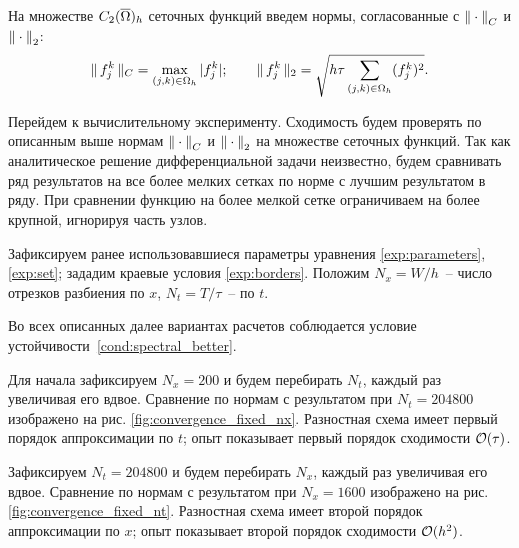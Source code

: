На множестве $C_2({\overline{\Omega}})_h$ сеточных функций введем нормы, согласованные с ${\| \cdot \|}_C$ и ${\| \cdot \|}_2$:
$$\| \, f_j^k \, \|_C = \max \limits_{(j, k) \in \Omega_h} |f_j^k|; \qquad \| \, f_j^k \, \|_2 = \sqrt{h \tau \sum \limits_{(j, k) \in \Omega_h} (f_j^k)^2} {\text{.}}$$

Перейдем к вычислительному эксперименту. Сходимость будем проверять по описанным выше нормам ${\| \cdot \|}_C$ и ${\| \cdot \|}_2$ на множестве сеточных функций. Так как аналитическое решение дифференциальной задачи неизвестно, будем сравнивать ряд результатов на все более мелких сетках по норме с лучшим результатом в ряду. При сравнении функцию на более мелкой сетке ограничиваем на более крупной, игнорируя часть узлов.

Зафиксируем ранее использовавшиеся параметры уравнения \eqref{exp:parameters}, \eqref{exp:set}; зададим краевые условия \eqref{exp:borders}. Положим $N_x = W / h$~-- число отрезков разбиения по $x$, $N_t = T / \tau$~-- по $t$.

Во всех описанных далее вариантах расчетов соблюдается условие устойчивости~\eqref{cond:spectral_better}.

Для начала зафиксируем $N_x = 200$ и будем перебирать $N_t$, каждый раз увеличивая его вдвое. Сравнение по нормам с результатом при $N_t = 204800$ изображено на рис. \ref{fig:convergence_fixed_nx}. Разностная схема имеет первый порядок аппроксимации по $t$; опыт показывает первый порядок сходимости ${\mathcal{O}} (\tau)$.

Зафиксируем $N_t = 204800$ и будем перебирать $N_x$, каждый раз увеличивая его вдвое. Сравнение по нормам с результатом при $N_x = 1600$ изображено на рис. \ref{fig:convergence_fixed_nt}. Разностная схема имеет второй порядок аппроксимации по $x$; опыт показывает второй порядок сходимости ${\mathcal{O}} (h^2)$.

